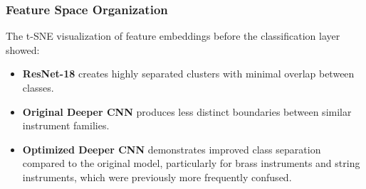 \subsubsection{Feature Space Organization}
The t-SNE visualization of feature embeddings before the classification layer showed:
\begin{itemize}
    \item \textbf{ResNet-18} creates highly separated clusters with minimal overlap between classes.
    
    \item \textbf{Original Deeper CNN} produces less distinct boundaries between similar instrument families.
    
    \item \textbf{Optimized Deeper CNN} demonstrates improved class separation compared to the original model, particularly for brass instruments and string instruments, which were previously more frequently confused.
\end{itemize}

